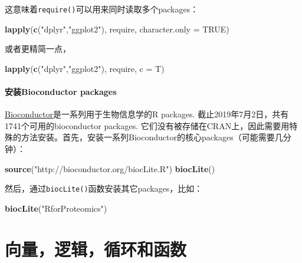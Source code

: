 \documentclass[]{book}
\newenvironment{Shaded}{\begin{snugshade}}{\end{snugshade}}
\newcommand{\DataTypeTok}[1]{\textcolor[rgb]{0.13,0.29,0.53}{#1}}
\newcommand{\KeywordTok}[1]{\textcolor[rgb]{0.13,0.29,0.53}{\textbf{#1}}}
\newcommand{\NormalTok}[1]{#1}
\newcommand{\OtherTok}[1]{\textcolor[rgb]{0.56,0.35,0.01}{#1}}
\newcommand{\StringTok}[1]{\textcolor[rgb]{0.31,0.60,0.02}{#1}}
\begin{document}
这意味着\texttt{require()}可以用来同时读取多个packages：

\begin{Shaded}
\begin{Highlighting}[]
\KeywordTok{lapply}\NormalTok{(}\KeywordTok{c}\NormalTok{(}\StringTok{"dplyr"}\NormalTok{,}\StringTok{"ggplot2"}\NormalTok{), require, }\DataTypeTok{character.only =} \OtherTok{TRUE}\NormalTok{)}
\end{Highlighting}
\end{Shaded}

或者更精简一点，

\begin{Shaded}
\begin{Highlighting}[]
\KeywordTok{lapply}\NormalTok{(}\KeywordTok{c}\NormalTok{(}\StringTok{"dplyr"}\NormalTok{,}\StringTok{"ggplot2"}\NormalTok{), require, }\DataTypeTok{c =}\NormalTok{ T)}
\end{Highlighting}
\end{Shaded}

\hypertarget{Bioconductor}{%
\subsubsection{安装Bioconductor packages}\label{Bioconductor}}

\href{https://bioconductor.org}{Bioconductor}是一系列用于生物信息学的R packages. 截止2019年7月2日，共有1741个可用的bioconductor packages. 它们没有被存储在CRAN上，因此需要用特殊的方法安装。首先，安装一系列Bioconductor的核心packages（可能需要几分钟）：

\begin{Shaded}
\begin{Highlighting}[]
\KeywordTok{source}\NormalTok{(}\StringTok{"http://bioconductor.org/biocLite.R"}\NormalTok{)}
\KeywordTok{biocLite}\NormalTok{()}
\end{Highlighting}
\end{Shaded}

然后，通过\texttt{biocLite()}函数安装其它packages，比如：

\begin{Shaded}
\begin{Highlighting}[]
\KeywordTok{biocLite}\NormalTok{(}\StringTok{"RforProteomics"}\NormalTok{)}
\end{Highlighting}
\end{Shaded}

\hypertarget{vectors-logicals-and-functions}{%
\chapter{向量，逻辑，循环和函数}\label{vectors-logicals-and-functions}}
\end{document}
